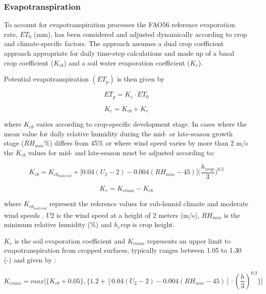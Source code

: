 \documentclass[]{article}
\begin{document}
\subsubsection{Evapotranspiration}\label{evapotranspiration}

To account for evapotranspiration processes the FAO56 reference
evaporation rate, \(ET_0\) (mm), has been considered and adjusted
dynamically according to crop and climate-specific factors. The approach
assumes a dual crop coefficient approach appropriate for daily time-step
calculations \citep{Allen1998} and made up of a basal crop coefficient
(\(K_{cb}\)) and a soil water evaporation coefficient (\(K_e\)).

Potential evapotranspiration \((ET_p)\) is then given by

\begin{equation}
ET_p=K_c \cdot ET_0
\label{eq:ETp}  
\end{equation}

\begin{equation}
K_c = K_{cb} + K_e
\label{eq:Kc}  
\end{equation}

where \(K_{cb}\) varies according to crop-specific development stage. In
cases where the mean value for daily relative humidity during the mid-
or late-season growth stage (\(RH_{min}\)\%) differs from 45\% or where
wind speed varies by more than 2 m/s the \(K_{cb}\) values for mid- and
late-season must be adjusted according to:

\begin{equation}
K_{cb}=K_{cb_{mid/end}} + \Big[ 0.04(U_2-2)-0.004(RH_{min}-45) \Big] \Big( \frac{h_{crop}}{3} \Big) ^{0.3}
\label{eq:Kcb}  
\end{equation}

\begin{equation}
K_e= K_{cmax}-K_{cb}
\label{eq:Ke}  
\end{equation}

where \(K_{cb_{mid/end}}\) represent the reference values for sub-humid
climate and moderate wind speeds \citep[see][]{Allen1998}. \(U2\) is the
wind speed at a height of 2 meters (m/s), \(RH_{min}\) is the minimum
relative humidity (\%) and \(h_crop\) is crop height.

\(K_e\) is the soil evaporation coefficient and \(K_{cmax}\) represents
an upper limit to evapotranspiration from cropped surfaces, typically
ranges between 1.05 to 1.30 (-) and given by \citep{Sheikh2009}:

\begin{equation}
K_{cmax}=max \Big[ \Big\{ K_{cb}+0.05 \Big\} , \Big\{ 1.2 + [0.04(U_2-2)-0.004(RH_{min}-45)] \cdot (\frac{h}{3})^{0.3} \Big\} \Big]
\label{eq:Kcmax}  
\end{equation}
\end{document}
